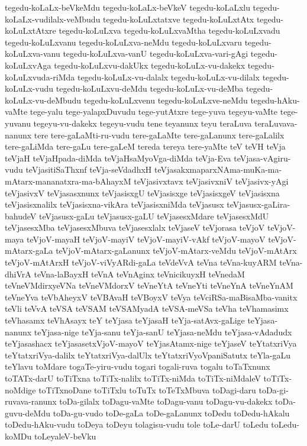 {tegedu-koLaLx-beVkeMdu
tegedu-koLaLx-beVkeV
tegedu-koLaLxlu
tegedu-koLaLx-vudilalx-veMbudu
tegedu-koLuLxtatxve
tegedu-koLuLxtAtx
tegedu-koLuLxtAtxre
tegedu-koLuLxva
tegedu-koLuLxvaMtha
tegedu-koLuLxvadu
tegedu-koLuLxvanu
tegedu-koLuLxva-neMdu
tegedu-koLuLxvaru
tegedu-koLuLxva-vanu
tegedu-koLuLxva-vanU
tegedu-koLuLxva-vari-gAgi
tegedu-koLuLxvAga
tegedu-koLuLxvu-dakUkx
tegedu-koLuLx-vu-dakekx
tegedu-koLuLxvuda-riMda
tegedu-koLuLx-vu-dalalx
tegedu-koLuLx-vu-dilalx
tegedu-koLuLx-vudu
tegedu-koLuLxvu-deMdu
tegedu-koLuLx-vu-deMba
tegedu-koLuLx-vu-deMbudu
tegedu-koLuLxvenu
tegedu-koLuLxve-neMdu
tegedu-hAku-vaMte
tege-yalu
tege-yalapxDuvudu
tege-yutAtxre
tege-yuva
tegeyu-vaMte
tege-yuvanu
tegeyu-vu-dakekx
tegeyu-vudu
tene
teyanunx
teyu
teraLuva
teraLuvava-nanunx
tere
tere-gaLaMti-ru-vudu
tere-gaLaMte
tere-gaLanunx
tere-gaLalilx
tere-gaLiMda
tere-gaLu
tere-gaLeM
tereda
tereya
tere-yaMte
teV
teVH
teVja
teVjaH
teVjaHpada-diMda
teVjaHsaMyoVga-diMda
teVja-Eva
teVjasa-vAgiru-vudu
teVjasitiSaThxnf
teVja-seVdadhxH
teVjasakxmaparxNAma-muKa-ma-mAtarx-mananatxra-ma-bAhayxM
teVjasivxtavx
teVjasivxniV
teVjasivx-yAgi
teVjasivxV
teVjasasxnunx
teVjasisxgU
teVjasisxge
teVjasisxgeV
teVjasisxna
teVjasisxnalilx
teVjasisxna-vikAra
teVjasisxniMda
teVjasusx
teVjasusx-gaLira-bahudeV
teVjasusx-gaLu
teVjasusx-gaLU
teVjasesxMdare
teVjasesxMdU
teVjasesxMba
teVjasesxMbuva
teVjasesxlalx
teVjaseV
teVjorasa
teVjoV
teVjoV-maya
teVjoV-mayaH
teVjoV-mayiV
teVjoV-mayiV-vAkf
teVjoV-mayoV
teVjoV-mAtarx-gaLa
teVjoV-mAtarx-gaLanunx
teVjoV-mAtarx-veMdu
teVjoV-mAtArx
teVjoV-mAtArxH
teVjoV-viVyARdi-gaLa
teVdeVvA
teVna
teVna-kuyARM
teVna-dhiVrA
teVna-laBayxH
teVnA
teVnAginx
teVnicikuyxH
teVnedaM
teVneVMdirxyeVNa
teVneVMdorxV
teVneYtA
teVneYti
teVneYnA
teVneYnAM
teVneYva
teVbAheyxV
teVBAvaH
teVBoyxV
teVya
teVciRSa-maBisaMba-vanitx
teVli
teVvA
teVSA
teVSAM
teVSAMyadA
teVSA-meVSa
teVha
teVhamasimx
teVhasamx
teVhAsayx
teY
teYjasa
teYjasaH
teYja-satAvx-gaLige
teYjasa-nanunx
teYjasa-nige
teYja-sanu
teYja-sanU
teYjasa-neMdu
teYjasa-vAdadudx
teYjasashacx
teYjasasetxVjoV-mayoV
teYjasAtamx-nige
teYjaseV
teYtatxriVya
teYtatxriVya-dalilx
teYtatxriVya-dalUlx
teYtatxriVyoVpaniSatutx
teYla-gaLu
teYlavu
toMdare
togaTe-yiru-vudu
togari
togali-ruva
togalu
toTaTxnunx
toTATx-darU
toTiTxna
toTiTx-nalilx
toTiTx-niMda
toTiTx-niMdaleV
toTiTx-noMdige
toTiTxnoDane
toTiTxlu
toTuTx
toTeTxMbuva
toDagi-daru
toDa-gi-ruvava-ranunx
toDa-gilalx
toDagu-vaMte
toDagu-vanu
toDagu-vu-dakekx
toDa-guvu-deMdu
toDa-gu-vudo
toDe-gaLa
toDe-gaLanunx
toDedu
toDedu-hAkalu
toDedu-hAku-vudu
toDeya
toDeyu
tolagisu-vudu
tole
toLe-darU
toLedu
toLedu-koMDu
toLeyaleV-beVku
}
